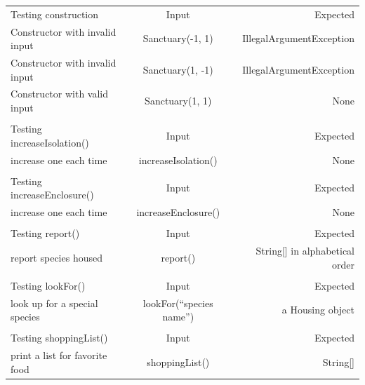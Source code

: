 \documentclass[12pt]{amsart}
\begin{document}
\begin{table}[htbp]
   \begin{tabular}{@{} lcr @{}} %

      Testing construction      & Input & Expected \\
         Constructor with invalid input       & Sanctuary(-1, 1)     &  IllegalArgumentException \\
         Constructor with invalid input       & Sanctuary(1, -1)     &  IllegalArgumentException \\
         Constructor with valid input       & Sanctuary(1, 1)     &  None \\
          & & \\
       Testing increaseIsolation() & Input & Expected \\
       increase one each time & increaseIsolation() & None\\
          & & \\
       Testing increaseEnclosure() & Input & Expected \\
       increase one each time & increaseEnclosure() & None\\
          & & \\
       Testing report() & Input & Expected \\
       report species housed & report() & String[] in alphabetical order\\
          & & \\
       Testing lookFor() & Input & Expected \\
       look up for a special species & lookFor(``species name'') & a Housing object\\
          & & \\
       Testing shoppingList() & Input & Expected \\
       print a list for favorite food & shoppingList() & String[]\\
    \end{tabular}
\end{table}
\end{document}

